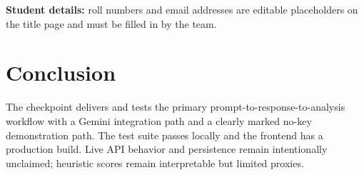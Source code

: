 \documentclass[11pt,a4paper]{article}
\begin{document}
\noindent\textbf{Student details:} roll numbers and email addresses are editable placeholders on the title page and must be filled in by the team.

\section{Conclusion}
The checkpoint delivers and tests the primary prompt-to-response-to-analysis
workflow with a Gemini integration path and a clearly marked no-key
demonstration path. The test suite passes locally and the frontend has a
production build. Live API behavior and persistence remain intentionally
unclaimed; heuristic scores remain interpretable but limited proxies.
\end{document}
